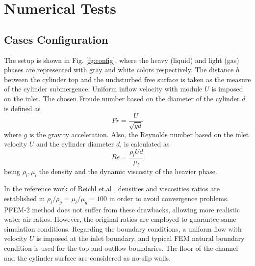 \section{Numerical Tests}

\subsection{Cases Configuration}

The setup is shown in Fig. \ref{fg:config}, where the heavy (liquid) and light (gas) phases are represented with gray and white colors respectively. The distance $h$ between the cylinder top and the undisturbed free surface is taken as the measure of the cylinder submergence. Uniform inflow velocity with module $U$ is imposed on the inlet. The chosen Froude number based on the diameter of the cylinder $d$ is defined as
\begin{equation}
 Fr = \frac{U}{\sqrt{gd}}
\label{eq:froude}
\end{equation}
where $g$ is the gravity acceleration. Also, the Reynolds number based on the inlet velocity $U$ and the cylinder diameter $d$, is calculated as
\begin{equation}
 Re = \frac{\rho_l U d}{\mu_l}
\label{eq:reynolds}
\end{equation}
being $\rho_l,\mu_l$ the density and the dynamic viscosity of the heavier phase.


In the reference work of Reichl et.al \cite{Reichl05}, densities and viscosities ratios are established in $\rho_l/\rho_g = \mu_l/\mu_g=100$ in order to avoid convergence problems. PFEM-2 method does not suffer from these drawbacks, allowing more realistic water-air ratios. However, the original ratios are employed to guarantee same simulation conditions. Regarding the boundary conditions, a uniform flow with velocity $U$ is imposed at the inlet boundary, and typical FEM natural boundary condition is used for the top and outflow boundaries. The floor of the channel and the cylinder surface are considered as no-slip walls.

